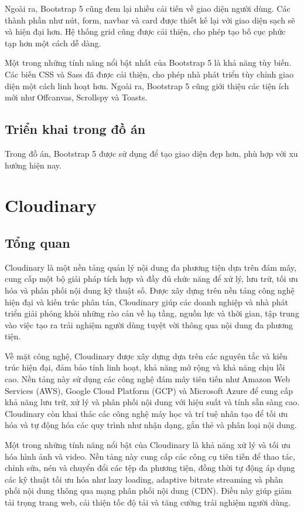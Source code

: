 \documentclass[../DoAn.tex]{subfiles}
\begin{document}
Ngoài ra, Bootstrap 5 cũng đem lại nhiều cải tiến về giao diện người dùng. Các thành phần như nút, form, navbar và card được thiết kế lại với giao diện sạch sẽ và hiện đại hơn. Hệ thống grid cũng được cải thiện, cho phép tạo bố cục phức tạp hơn một cách dễ dàng.

Một trong những tính năng nổi bật nhất của Bootstrap 5 là khả năng tùy biến. Các biến CSS và Sass đã được cải thiện, cho phép nhà phát triển tùy chỉnh giao diện một cách linh hoạt hơn. Ngoài ra, Bootstrap 5 cũng giới thiệu các tiện ích mới như Offcanvas, Scrollspy và Toasts.

\subsection{Triển khai trong đồ án}
\label{subsection:3.7.2}
Trong đồ án, Bootstrap 5 được sử dụng để tạo giao diện đẹp hơn, phù hợp với xu hướng hiện nay.

\section{Cloudinary}
\label{section:3.8}
\subsection{Tổng quan}
\label{subsection:3.8.1}
Cloudinary là một nền tảng quản lý nội dung đa phương tiện dựa trên đám mây, cung cấp một bộ giải pháp tích hợp và đầy đủ chức năng để xử lý, lưu trữ, tối ưu hóa và phân phối nội dung kỹ thuật số. Được xây dựng trên nền tảng công nghệ hiện đại và kiến trúc phân tán, Cloudinary giúp các doanh nghiệp và nhà phát triển giải phóng khỏi những rào cản về hạ tầng, nguồn lực và thời gian, tập trung vào việc tạo ra trải nghiệm người dùng tuyệt vời thông qua nội dung đa phương tiện.

Về mặt công nghệ, Cloudinary được xây dựng dựa trên các nguyên tắc và kiến trúc hiện đại, đảm bảo tính linh hoạt, khả năng mở rộng và khả năng chịu lỗi cao. Nền tảng này sử dụng các công nghệ đám mây tiên tiến như Amazon Web Services (AWS), Google Cloud Platform (GCP) và Microsoft Azure để cung cấp khả năng lưu trữ, xử lý và phân phối nội dung với hiệu suất và tính sẵn sàng cao. Cloudinary còn khai thác các công nghệ máy học và trí tuệ nhân tạo để tối ưu hóa và tự động hóa các quy trình như nhận dạng, gắn thẻ và phân loại nội dung.

Một trong những tính năng nổi bật của Cloudinary là khả năng xử lý và tối ưu hóa hình ảnh và video. Nền tảng này cung cấp các công cụ tiên tiến để thao tác, chỉnh sửa, nén và chuyển đổi các tệp đa phương tiện, đồng thời tự động áp dụng các kỹ thuật tối ưu hóa như lazy loading, adaptive bitrate streaming và phân phối nội dung thông qua mạng phân phối nội dung (CDN). Điều này giúp giảm tải trọng trang web, cải thiện tốc độ tải và tăng cường trải nghiệm người dùng.
\end{document}
